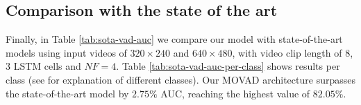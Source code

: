 \subsection{Comparison with the state of the art}
Finally, in Table \ref{tab:sota-vad-auc} we compare our model with state-of-the-art models using input videos of $320\times240$ and $640\times480$, with video clip length of 8, 3 LSTM cells and $NF=4$.
Table \ref{tab:sota-vad-auc-per-class} shows results per class (see \cite{9712446} for explanation of different classes).
Our MOVAD architecture surpasses the state-of-the-art model by $2.75\%$ AUC, reaching the highest value of $82.05\%$.

